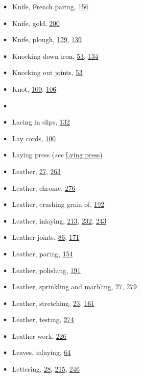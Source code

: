 \documentclass[
]{article}
\begin{document}
\begin{itemize}
\item
  Knife, French paring, \protect\hyperlink{Page_156}{156}
\item
  Knife, gold, \protect\hyperlink{Page_200}{200}
\item
  Knife, plough, \protect\hyperlink{Page_129}{129},
  \protect\hyperlink{Page_139}{139}
\item
  Knocking down iron, \protect\hyperlink{Page_53}{53},
  \protect\hyperlink{Page_134}{134}
\item
  Knocking out joints, \protect\hyperlink{Page_53}{53}
\item
  Knot, \protect\hyperlink{Page_100}{100},
  \protect\hyperlink{Page_106}{106}
\item
  ~
\item
  {Lacing} in slips, \protect\hyperlink{Page_132}{132}
\item
  Lay cords, \protect\hyperlink{Page_100}{100}
\item
  Laying press (\emph{see} \protect\hyperlink{Lying_press}{Lying press})
\item
  Leather, \protect\hyperlink{Page_27}{27},
  \protect\hyperlink{Page_263}{263}
\item
  Leather, chrome, \protect\hyperlink{Page_276}{276}
\item
  Leather, crushing grain of, \protect\hyperlink{Page_192}{192}
\item
  Leather, inlaying, \protect\hyperlink{Page_213}{213},
  \protect\hyperlink{Page_232}{232}, \protect\hyperlink{Page_243}{243}
\item
  Leather joints, \protect\hyperlink{Page_86}{86},
  \protect\hyperlink{Page_171}{171}
\item
  Leather, paring, \protect\hyperlink{Page_154}{154}
\item
  Leather, polishing, \protect\hyperlink{Page_191}{191}
\item
  Leather, sprinkling and marbling, \protect\hyperlink{Page_27}{27},
  \protect\hyperlink{Page_279}{279}
\item
  Leather, stretching, \protect\hyperlink{Page_23}{23},
  \protect\hyperlink{Page_161}{161}
\item
  Leather, testing, \protect\hyperlink{Page_274}{274}
\item
  Leather work, \protect\hyperlink{Page_226}{226}
\item
  Leaves, inlaying, \protect\hyperlink{Page_64}{64}
\item
  Lettering, \protect\hyperlink{Page_28}{28},
  \protect\hyperlink{Page_215}{215}, \protect\hyperlink{Page_246}{246}

\end{itemize}
\end{document}
